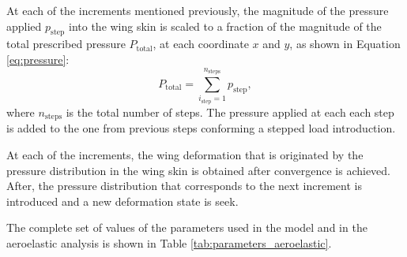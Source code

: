     At each of the increments mentioned previously, the magnitude of the pressure applied $p_{\mathrm{step}}$ into the wing skin is scaled to a fraction of the magnitude of the total prescribed pressure $P_{\mathrm{total}}$, at each coordinate $x$ and $y$, as shown in Equation \ref{eq:pressure}:
    \begin{equation}
      P_{\mathrm{total}} = \sum_{i_{\mathrm{step}} = 1}^{n_{\mathrm{steps}}} p_{\mathrm{step}},
      \label{eq:pressure}
    \end{equation}
    where $n_{\mathrm{steps}}$ is the total number of steps. The pressure applied at each each step is added to the one from previous steps conforming a stepped load introduction.

    At each of the increments, the wing deformation that is originated by the pressure distribution in the wing skin is obtained after convergence is achieved. After, the pressure distribution that corresponds to the next increment is introduced and a new deformation state is seek.

    The complete set of values of the parameters used in the model and in the aeroelastic analysis is shown in Table \ref{tab:parameters_aeroelastic}.

